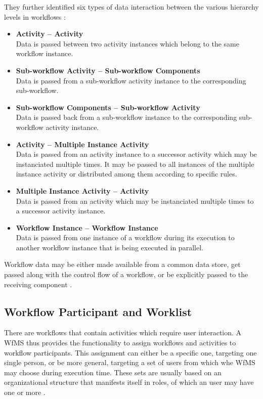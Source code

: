     They further identified six types of data interaction between the various hierarchy levels in workflows \cite[p.~16-24]{Russell2005Workflow}:
    \begin{itemize}
      \item \textbf{Activity -- Activity} \hfill \\
        Data is passed between two activity instances which belong to the same workflow instance.
      \item \textbf{Sub-workflow Activity -- Sub-workflow Components} \hfill \\
        Data is passed from a sub-workflow activity instance to the corresponding sub-workflow.
      \item \textbf{Sub-workflow Components -- Sub-workflow Activity} \hfill \\
        Data is passed back from a sub-workflow instance to the corresponding sub-workflow activity instance.
      \item \textbf{Activity -- Multiple Instance Activity} \hfill \\
        Data is passed from an activity instance to a successor activity which may be instanciated multiple times. It may be passed to all instances of the multiple instance activity or distributed among them according to specific rules.
      \item \textbf{Multiple Instance Activity -- Activity} \hfill \\
        Data is passed from an activity which may be instanciated multiple times to a successor activity instance.
      \item \textbf{Workflow Instance -- Workflow Instance} \hfill \\
        Data is passed from one instance of a workflow during its execution to another workflow instance that is being executed in parallel.
    \end{itemize}

    Workflow data may be either made available from a common data store, get passed along with the control flow of a workflow, or be explicitly passed to the receiving component \cite[pp.~16-21]{Russell2005Workflow}.

  \subsection{Workflow Participant and Worklist} %
  \label{sub:workflow_participants}
    There are workflows that contain activities which require user interaction. A \ac{WfMS} thus provides the functionality to assign workflows and activities to workflow participants. This assignment can either be a specific one, targeting one single person, or be more general, targeting a set of users from which whe \ac{WfMS} may choose during execution time. These sets are usually based on an organizational structure that manifests itself in roles, of which an user may have one or more \cite{Hollingsworth1995Wfmc,Casati1999Specification}.

